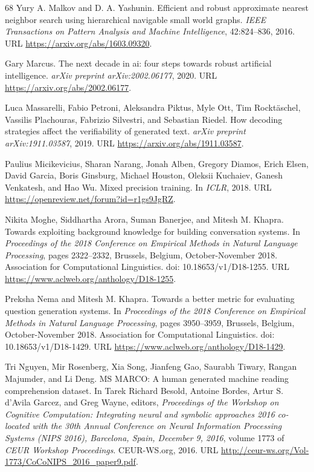 \documentclass[10pt,letterpaper]{article}
\begin{document}
{\begin{thebibliography}{68}
 Yury A. Malkov and D. A. Yashunin. Efficient and robust
approximate nearest neighbor search using hierarchical navigable small world
graphs. \emph{IEEE Transactions on Pattern Analysis and Machine Intelligence},
42:824--836, 2016. URL \url{https://arxiv.org/abs/1603.09320}.

 Gary Marcus. The next decade in ai: four steps towards robust
artificial intelligence. \emph{arXiv preprint arXiv:2002.06177}, 2020. URL
\url{https://arxiv.org/abs/2002.06177}.

 Luca Massarelli, Fabio Petroni, Aleksandra Piktus, Myle Ott, Tim
Rocktäschel, Vassilis Plachouras, Fabrizio Silvestri, and Sebastian Riedel. How
decoding strategies affect the verifiability of generated text. \emph{arXiv
preprint arXiv:1911.03587}, 2019. URL \url{https://arxiv.org/abs/1911.03587}.

 Paulius Micikevicius, Sharan Narang, Jonah Alben, Gregory Diamos,
Erich Elsen, David Garcia, Boris Ginsburg, Michael Houston, Oleksii Kuchaiev,
Ganesh Venkatesh, and Hao Wu. Mixed precision training. In \emph{ICLR}, 2018.
URL \url{https://openreview.net/forum?id=r1gs9JgRZ}.

 Nikita Moghe, Siddhartha Arora, Suman Banerjee, and Mitesh M.
Khapra. Towards exploiting background knowledge for building conversation
systems. In \emph{Proceedings of the 2018 Conference on Empirical Methods in
Natural Language Processing}, pages 2322--2332, Brussels, Belgium,
October-November 2018. Association for Computational Linguistics. doi:
10.18653/v1/D18-1255. URL \url{https://www.aclweb.org/anthology/D18-1255}.

 Preksha Nema and Mitesh M. Khapra. Towards a better metric for
evaluating question generation systems. In \emph{Proceedings of the 2018
Conference on Empirical Methods in Natural Language Processing}, pages
3950--3959, Brussels, Belgium, October-November 2018. Association for
Computational Linguistics. doi: 10.18653/v1/D18-1429. URL
\url{https://www.aclweb.org/anthology/D18-1429}.

 Tri Nguyen, Mir Rosenberg, Xia Song, Jianfeng Gao, Saurabh
Tiwary, Rangan Majumder, and Li Deng. MS MARCO: A human generated machine
reading comprehension dataset. In Tarek Richard Besold, Antoine Bordes, Artur
S. d'Avila Garcez, and Greg Wayne, editors, \emph{Proceedings of the Workshop on
Cognitive Computation: Integrating neural and symbolic approaches 2016
co-located with the 30th Annual Conference on Neural Information Processing
Systems (NIPS 2016), Barcelona, Spain, December 9, 2016}, volume 1773 of
\emph{CEUR Workshop Proceedings}. CEUR-WS.org, 2016. URL
\url{http://ceur-ws.org/Vol-1773/CoCoNIPS_2016_paper9.pdf}.


\end{thebibliography}}
\end{document}
